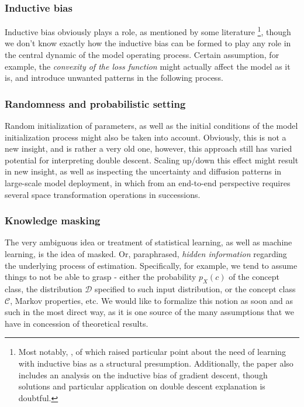 \documentclass{article}
\begin{document}
\subsubsection{Inductive bias}
Inductive bias obviously plays a role, as mentioned by some literature \footnote{Most notably, \cite{lafon_understanding_2024}, of which raised particular point about the need of learning with inductive bias as a structural presumption. Additionally, the paper also includes an analysis on the inductive bias of gradient descent, though solutions and particular application on double descent explanation is doubtful.}, though we don't know exactly how the inductive bias can be formed to play any role in the central dynamic of the model operating process. Certain assumption, for example, the \textit{convexity of the loss function} might actually affect the model as it is, and introduce unwanted patterns in the following process. 
\subsubsection{Randomness and probabilistic setting}
Random initialization of parameters, as well as the initial conditions of the model initialization process might also be taken into account. Obviously, this is not a new insight, and is rather a very old one, however, this approach still has varied potential for interpreting double descent. Scaling up/down this effect might result in new insight, as well as inspecting the uncertainty and diffusion patterns in large-scale model deployment, in which from an end-to-end perspective requires several space transformation operations in successions.
\subsubsection{Knowledge masking}
The very ambiguous idea or treatment of statistical learning, as well as machine learning, is the idea of masked. Or, paraphrased, \textit{hidden information} regarding the underlying process of estimation. Specifically, for example, we tend to assume things to not be able to grasp - either the probability $p_{X}(c)$ of the concept class, the distribution $\mathcal{D}$ specified to such input distribution, or the concept class $\mathcal{C}$, Markov properties, etc. We would like to formalize this notion as soon and as such in the most direct way, as it is one source of the many assumptions that we have in concession of theoretical results. 

\clearpage
\end{document}
